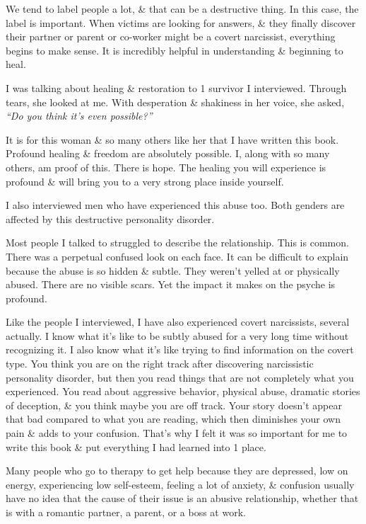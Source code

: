 \documentclass{article}
\numberwithin{equation}{section}
\begin{document}
We tend to label people a lot, \& that can be a destructive thing. In this case, the label is important. When victims are looking for answers, \& they finally discover their partner or parent or co-worker might be a covert narcissist, everything begins to make sense. It is incredibly helpful in understanding \& beginning to heal.

I was talking about healing \& restoration to 1 survivor I interviewed. Through tears, she looked at me. With desperation \& shakiness in her voice, she asked, \textit{``Do you think it's even possible?''}

It is for this woman \& so many others like her that I have written this book. Profound healing \& freedom are absolutely possible. I, along with so many others, am proof of this. There is hope. The healing you will experience is profound \& will bring you to a very strong place inside yourself.

I also interviewed men who have experienced this abuse too. Both genders are affected by this destructive personality disorder.

Most people I talked to struggled to describe the relationship. This is common. There was a perpetual confused look on each face. It can be difficult to explain because the abuse is so hidden \& subtle. They weren't yelled at or physically abused. There are no visible scars. Yet the impact it makes on the psyche is profound.

Like the people I interviewed, I have also experienced covert narcissists, several actually. I know what it's like to be subtly abused for a very long time without recognizing it. I also know what it's like trying to find information on the covert type. You think you are on the right track after discovering narcissistic personality disorder, but then you read things that are not completely what you experienced. You read about aggressive behavior, physical abuse, dramatic stories of deception, \& you think maybe you are off track. Your story doesn't appear that bad compared to what you are reading, which then diminishes your own pain \& adds to your confusion. That's why I felt it was so important for me to write this book \& put everything I had learned into 1 place.

Many people who go to therapy to get help because they are depressed, low on energy, experiencing low self-esteem, feeling a lot of anxiety, \& confusion usually have no idea that the cause of their issue is an abusive relationship, whether that is with a romantic partner, a parent, or a boss at work.
\end{document}
